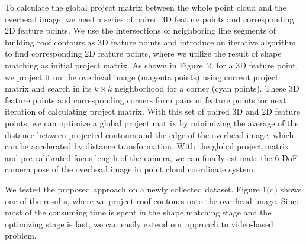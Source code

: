 \documentclass[sigconf,review,anonymous]{acmart}
\begin{document}
To calculate the global project matrix between the whole point cloud and the overhead image, we need a series of paired 3D feature points and corresponding 2D feature points. We use the intersections of neighboring line segments of building roof contours as 3D feature points and introduce an iterative algorithm to find corresponding 2D feature points, where we utilize the result of shape matching as initial project matrix.
As shown in Figure~2, for a 3D feature point, we project it on the overhead image (magenta points) using current project matrix and search in its $k\times k$ neighborhood for a corner (cyan points). These 3D feature points and corresponding corners form pairs of feature points for next iteration of calculating project matrix.
With this set of paired 3D and 2D feature points, we can optimize a global project matrix by minimizing the average of the distance between projected contours and the edge of the overhead image, which can be accelerated by distance transformation. With the global project matrix and pre-calibrated focus length of the camera, we can finally estimate the 6 DoF camera pose of the overhead image in point cloud coordinate system.

We tested the proposed approach on a newly collected dataset. Figure 1(d) shows one of the results, where we project roof contours onto the overhead image. Since most of the consuming time is spent in the shape matching stage and the optimizing stage is fast, we can easily extend our approach to video-based problem. 


 
\end{document}
